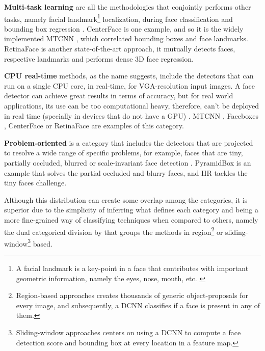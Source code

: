 \documentclass[class=report, crop=false, a4paper, 12pt]{standalone}
\begin{document}
\vspace{0.7\baselineskip}
\label{mt learning}
\par \noindent \textbf{Multi-task learning} are all the methodologies that conjointly performs other tasks, namely facial landmark\footnote{A facial landmark is a key-point in a face that contributes with important geometric information, namely the eyes, nose, mouth, etc. \autocite{fengWingLossRobust2018}} localization, during face classification and bounding box regression \autocite{duElementsEndtoendDeep2022}. CenterFace \autocite{xuCenterFaceJointFace2019} is one example, and so it is the widely implemented MTCNN \autocite{zhangJointFaceDetection2016a}, which correlated bounding boxes and face landmarks. RetinaFace \autocite{dengRetinaFaceSinglestageDense2019} is another state-of-the-art approach, it mutually detects faces, respective landmarks and performs dense 3D face regression.

\vspace{0.7\baselineskip}
\par \noindent \textbf{CPU real-time} methods, as the name suggests, include the detectors that can run on a single CPU core, in real-time, for VGA-resolution input images. A face detector can achieve great results in terms of accuracy, but for real world applications, its use can be too computational heavy, therefore, can't be deployed in real time (specially in devices that do not have a GPU) \autocite{duElementsEndtoendDeep2022}. MTCNN \autocite{zhangJointFaceDetection2016a}, Faceboxes \autocite{zhangFaceBoxesCPURealtime2018}, CenterFace \autocite{xuCenterFaceJointFace2019} or RetinaFace \autocite{dengRetinaFaceSinglestageDense2019} are examples of this category.

\vspace{0.7\baselineskip}
\par \noindent \textbf{Problem-oriented} is a category that includes the detectors that are projected to resolve a wide range of specific problems, for example, faces that are tiny, partially occluded, blurred or scale-invariant face detection \autocite{duElementsEndtoendDeep2022}. PyramidBox \autocite{tangPyramidBoxContextassistedSingle2018} is an example that solves the partial occluded and blurry faces, and HR \autocite{huFindingTinyFaces2017} tackles the tiny faces challenge.

\vspace{0.7\baselineskip}
Although this distribution can create some overlap among the categories, it is superior due to the simplicity of inferring what defines each category and being a more fine-grained way of classifying techniques when compared to others, namely the dual categorical division by \autocite{ranjanDeepLearningUnderstanding2018} that groups the methods in region\footnote{Region-based approaches creates thousands of generic object-proposals for every image, and subsequently, a DCNN classifies if a face is present in any of them.} or sliding-window\footnote{Sliding-window approaches centers on using a DCNN to compute a face detection score and bounding box at every location in a feature map.} based. 
\end{document}
